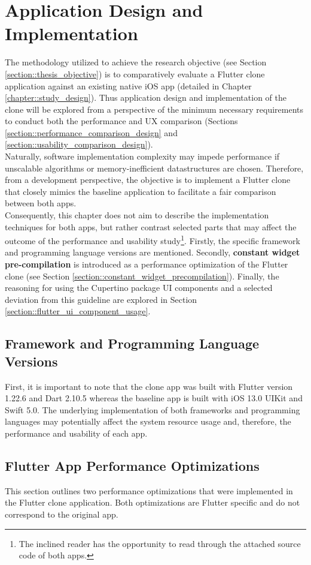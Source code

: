 \chapter{Application Design and Implementation} \label{chapter::implementation}
The methodology utilized to achieve the research objective (see Section \ref{section::thesis_objective}) is to comparatively evaluate a Flutter clone application against an existing native iOS app (detailed in Chapter \ref{chapter::study_design}).
Thus application design and implementation of the clone will be explored from a perspective of the minimum necessary requirements to conduct both the performance and UX comparison (Sections \ref{section::performance_comparison_design} and \ref{section::usability_comparison_design}).\\
Naturally, software implementation complexity may impede performance if unscalable algorithms or memory-inefficient datastructures are chosen.
Therefore, from a development perspective, the objective is to implement a Flutter clone that closely mimics the baseline application to facilitate a fair comparison between both apps.\\
Consequently, this chapter does not aim to describe the implementation techniques for both apps, but rather contrast selected parts that may affect the outcome of the performance and usability study\footnote{The inclined reader has the opportunity to read through the attached source code of both apps.}.
Firstly, the specific framework and programming language versions are mentioned.
Secondly, \textbf{constant widget pre-compilation} is introduced as a performance optimization of the Flutter clone (see Section \ref{section::constant_widget_precompilation}).
Finally, the reasoning for using the Cupertino package UI components and a selected deviation from this guideline are explored in Section \ref{section::flutter_ui_component_usage}.

\section{Framework and Programming Language Versions}
First, it is important to note that the clone app was built with Flutter version 1.22.6 and Dart 2.10.5 whereas the baseline app is built with iOS 13.0 UIKit and Swift 5.0.
The underlying implementation of both frameworks and programming languages may potentially affect the system resource usage and, therefore, the performance and usability of each app.

\section{Flutter App Performance Optimizations}
This section outlines two performance optimizations that were implemented in the Flutter clone application. Both optimizations are Flutter specific and 
do not correspond to the original app.

